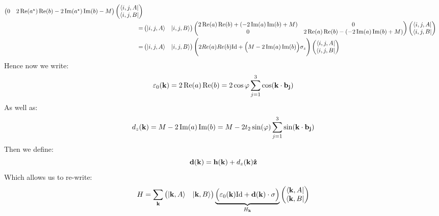 \documentclass[10pt,a4paper]{article}
\begin{document}
\begin{enumerate}
\begin{align*}
\begin{pmatrix}
0 & 2 \Re(a^\star) \Re(b) - 2 \Im(a^\star) \Im(b) - M
\end{pmatrix}
\begin{pmatrix}
\bra{i, j, A}\\
\bra{i, j, B}
\end{pmatrix}
\\
=
&\begin{pmatrix}
\ket{i, j, A} & \ket{i, j, B}
\end{pmatrix} \begin{pmatrix}
2 \Re(a)\Re(b) + (-2 \Im(a) \Im(b) + M)& 0\\
0 & 2 \Re(a) \Re(b) - (-2 \Im(a) \Im(b) + M) 
\end{pmatrix}
\begin{pmatrix}
\bra{i, j, A}\\
\bra{i, j, B}
\end{pmatrix}
\\
=
&\begin{pmatrix}
\ket{i, j, A} & \ket{i, j, B}
\end{pmatrix} \Bigg(2 Re(a) Re(b) \text{Id} + \Big(M - 2 \Im(a) \Im(b) \Big) \sigma_z \Bigg)
\begin{pmatrix}
\bra{i, j, A}\\
\bra{i, j, B}
\end{pmatrix}
\end{align*}
Hence now we write:
\[
\varepsilon_0(\vb{k}) = 2 \Re(a) \Re(b) = 2 \cos\varphi \sum_{j = 1}^3 \cos(\vb{k} \cdot \vb{b_j})
\]
As well as:
\[
d_z(\vb{k}) = M - 2 \Im(a) \Im(b) = M - 2 t_2 \sin(\varphi) \sum_{j = 1}^3 \sin(\vb{k} \cdot \vb{b_j})
\]
Then we define:
\[
\vb{d}(\vb{k}) = \vb{h}(\vb{k}) + d_z(\vb{k}) \vu{z}
\]
Which allows us to re-write:
\[
H = \sum_{\vb{k}} \begin{pmatrix}
\ket{\vb{k}, A} & \ket{\vb{k}, B}
\end{pmatrix}
\underbrace{\Big( \varepsilon_0(\vb{k}) \text{Id} + \vb{d}(\vb{k}) \cdot \vb{\sigma} \Big)}_{H_{\vb{k}}} \begin{pmatrix}
\bra{\vb{k}, A}\\
\bra{\vb{k}, B}
\end{pmatrix}
\]


\end{enumerate}
\end{document}
